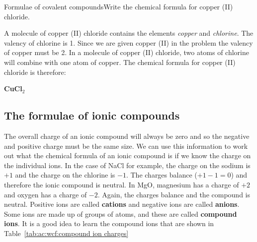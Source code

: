 \begin{wex}{Formulae of covalent compounds}{Write the chemical formula for copper (II) chloride.}{
A molecule of copper (II) chloride contains the elements \textit{copper} and \textit{chlorine}.
The valency of chlorine is 1. Since we are given copper (II) in the problem the valency of copper must be 2. In a molecule of copper (II) chloride, two atoms of chlorine will combine with one atom of copper.
The chemical formula for copper (II) chloride is therefore:

\begin{center}
\textbf{CuCl$_{2}$}
\end{center}}
\end{wex}

\subsection{The formulae of ionic compounds}

The overall charge of an ionic compound will always be zero and so the negative and positive charge must be the same size. We can use this information to work out what the chemical formula of an ionic compound is if we know the charge on the individual ions. In the case of NaCl for example, the charge on the sodium is $+1$ and the charge on the chlorine is $-1$. The charges balance ($+1-1=0$) and therefore the ionic compound is neutral. In MgO, magnesium has a charge of $+2$ and oxygen has a charge of $-2$. Again, the charges balance and the compound is neutral. Positive ions are called \textbf{cations} and negative ions are called \textbf{anions}.\\

Some ions are made up of groups of atoms, and these are called \textbf{compound ions}. It is a good idea to learn the compound ions that are shown in Table~\ref{tab:ac:wcf:compound ion charges}

